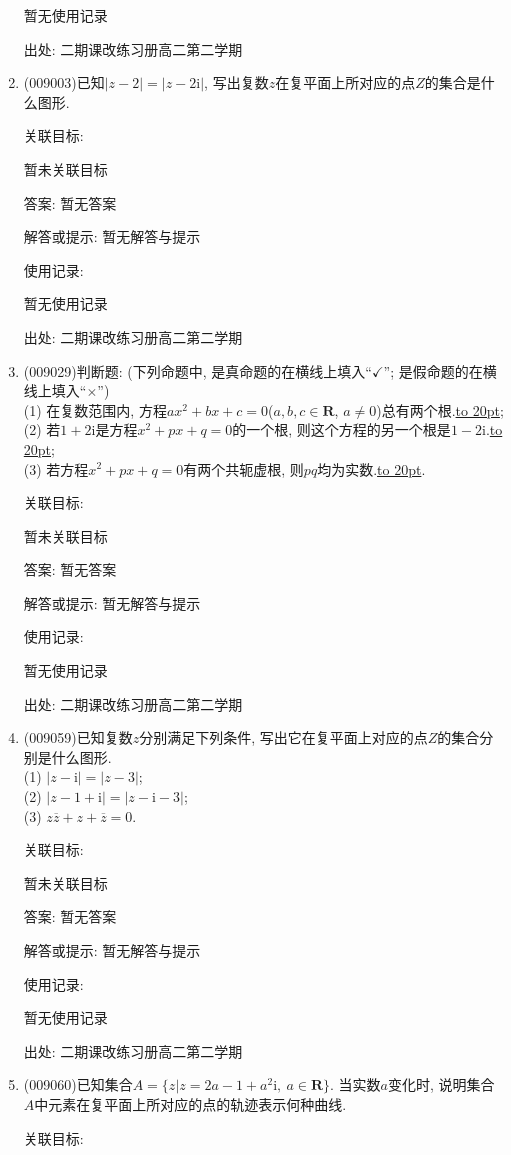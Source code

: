 \documentclass[10pt,a4paper]{article}
\newcommand{\blank}[1]{\underline{\hbox to #1pt{}}}
\begin{document}
\begin{enumerate}[1.]
暂无使用记录


出处: 二期课改练习册高二第二学期
\item { (009003)}已知$|z-2|=|z-2\mathrm{i}|$, 写出复数$z$在复平面上所对应的点$Z$的集合是什么图形.


关联目标:

暂未关联目标

答案: 暂无答案

解答或提示: 暂无解答与提示

使用记录:

暂无使用记录


出处: 二期课改练习册高二第二学期
\item { (009029)}判断题: (下列命题中, 是真命题的在横线上填入``$\checkmark$''; 是假命题的在横线上填入``$\times$'')\\
(1) 在复数范围内, 方程$ax^2+bx+c=0$($a,b,c\in \mathbf{R}$, $a\ne 0$)总有两个根.\blank{20};\\
(2) 若$1+2\mathrm{i}$是方程$x^2+px+q=0$的一个根, 则这个方程的另一个根是$1-2\mathrm{i}$.\blank{20};\\
(3) 若方程$x^2+px+q=0$有两个共轭虚根, 则$pq$均为实数.\blank{20}.


关联目标:

暂未关联目标

答案: 暂无答案

解答或提示: 暂无解答与提示

使用记录:

暂无使用记录


出处: 二期课改练习册高二第二学期
\item { (009059)}已知复数$z$分别满足下列条件, 写出它在复平面上对应的点$Z$的集合分别是什么图形.\\
(1) $|z-\mathrm{i}|=|z-3|$;\\ 
(2) $|z-1+\mathrm{i}|=|z-\mathrm{i}-3|$;\\
(3) $z\overline z+z+\overline z=0$.


关联目标:

暂未关联目标

答案: 暂无答案

解答或提示: 暂无解答与提示

使用记录:

暂无使用记录


出处: 二期课改练习册高二第二学期
\item { (009060)}已知集合$A=\{z|z=2a-1+a^2\mathrm{i},\ a\in \mathbf{R}\}$. 当实数$a$变化时, 说明集合$A$中元素在复平面上所对应的点的轨迹表示何种曲线.


关联目标:


\end{enumerate}
\end{document}
